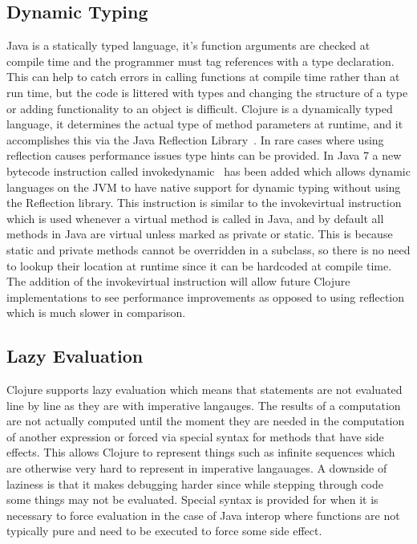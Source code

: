 \subsection{Dynamic Typing}
Java is a statically typed language, it's function arguments are checked at compile time and the programmer must tag references with a type declaration. This can help to catch errors in calling functions at compile time rather than at run time, but the code is littered with types and changing the structure of a type or adding functionality to an object is difficult.  
Clojure is a dynamically typed language, it determines the actual type of method parameters at runtime, and it accomplishes this via the Java Reflection Library~\cite{reflection}. In rare cases where using reflection causes performance issues type hints can be provided. In Java 7 a new bytecode instruction called invokedynamic~\cite{invokedynamic} has been added which allows dynamic languages on the JVM to have native support for dynamic typing without using the Reflection library. This instruction is similar to the invokevirtual instruction which is used whenever a virtual method is called in Java, and by default all methods in Java are virtual unless marked as private or static. This is because static and private methods cannot be overridden in a subclass, so there is no need to lookup their location at runtime since it can be hardcoded at compile time. The addition of the invokevirtual instruction will allow future Clojure implementations to see performance improvements as opposed to using reflection which is much slower in comparison.  

\subsection{Lazy Evaluation}
Clojure supports lazy evaluation which means that statements are not evaluated line by line as they are with imperative langauges. The results of a computation are not actually computed until the moment they are needed in the computation of another expression or forced via special syntax for methods that have side effects. This allows Clojure to represent things such as infinite sequences which are otherwise very hard to represent in imperative langauages. A downside of laziness is that it makes debugging harder since while stepping through code some things may not be evaluated. Special syntax is provided for when it is necessary to force evaluation in the case of Java interop where functions are not typically pure and need to be executed to force some side effect.

